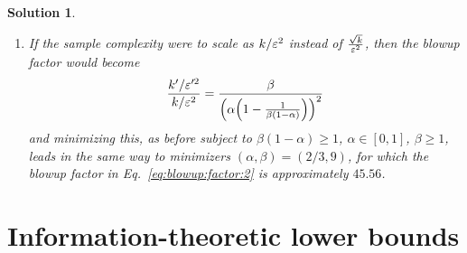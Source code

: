 \documentclass[biber,plain]{nowfnt} %
\newtheorem{solution}{Solution}[chapter]
\begin{document}
\begin{solution}
\begin{enumerate}
\begin{equation}
  	\label{eq:blowup:factor}
  	\frac{\sqrt{\beta}}{\Paren{\alpha\Paren{1-\frac{1}{\beta(1-\alpha)}}}^2}
  \end{equation}
  subject to $\beta(1-\alpha)\geq 1$, $\alpha\in[0,1]$, $\beta \geq 1$. For the sake of the minimization, it is easier to minimize the square of this quantity, and to set $ \gamma \eqdef \beta(1-\alpha)$, so that we seek to find the minimizer of
  \[
  		\frac{\beta}{\alpha^4\Paren{1-\frac{1}{\beta(1-\alpha)}}^4} = \frac{1}{\alpha^4(1-\alpha)} \cdot \frac{\gamma^5}{(\gamma-1)^4}
  \]
  subject to $\alpha\in[0,1]$ and $\gamma \geq 1$. The variables are now separated, and we can minimize separately in $\alpha$ and in $\gamma$. This leads to minimizers $\alpha^\ast=4/5$ and $\gamma^\ast=5$. Getting back to our original quantity, we therefore get that it is minimized for $(\alpha,\beta)=(4/5, 25)$, for which the blowup factor in Eq.~\eqref{eq:blowup:factor} is approximately $\boxed{12.21}$.
  \item If the sample complexity were to scale as $k/\varepsilon^2$ instead of $\frac{\sqrt{k}}{\varepsilon^2}$, then the blowup factor would become 
  \begin{equation}
  	\label{eq:blowup:factor:2}
  	\frac{\ab'/\dst'^2}{\ab/\dst^2} = \frac{\beta}{\Paren{\alpha\Paren{1-\frac{1}{\beta(1-\alpha)}}}^2}
  \end{equation}
  and minimizing this, as before subject to $\beta(1-\alpha)\geq 1$, $\alpha\in[0,1]$, $\beta \geq 1$, leads in the same way to minimizers $(\alpha,\beta)=(2/3, 9)$, for which the blowup factor in Eq.~\eqref{eq:blowup:factor:2} is approximately $\boxed{45.56}$.
\end{enumerate}
\end{solution}

\chapter{Information-theoretic lower bounds}
  \label{chap:lowerbounds}
  
\end{document}
